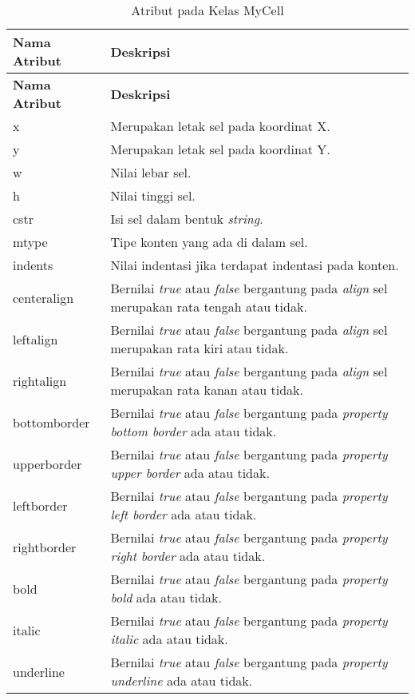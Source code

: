 \begin{small}
\begin{longtable}{ | p{3cm} | p{8cm} | }
    \caption{Atribut pada Kelas MyCell}
    \label{AtributMyCell}\\ \hline
    \centering\bfseries{Nama Atribut} & \centering\bfseries{Deskripsi} \tabularnewline \hline
    \endfirsthead
    \hline
    \centering\bfseries{Nama Atribut} & \centering\bfseries{Deskripsi} \tabularnewline \hline
    \endhead
    x & Merupakan letak sel pada koordinat X.\\ \hline
    y & Merupakan letak sel pada koordinat Y. \\ \hline
    w & Nilai lebar sel.\\ \hline
    h & Nilai tinggi sel.\\ \hline
    cstr & Isi sel dalam bentuk \textit{string}.\\ \hline
    mtype & Tipe konten yang ada di dalam sel.\\ \hline
    indents & Nilai indentasi jika terdapat indentasi pada konten.\\ \hline
    centeralign & Bernilai \textit{true} atau \textit{false} bergantung pada \textit{align} sel merupakan rata tengah atau tidak.\\ \hline
    leftalign & Bernilai \textit{true} atau \textit{false} bergantung pada \textit{align} sel merupakan rata kiri atau tidak.\\ \hline
    rightalign & Bernilai \textit{true} atau \textit{false} bergantung pada \textit{align} sel merupakan rata kanan atau tidak.\\ \hline
    bottomborder & Bernilai \textit{true} atau \textit{false} bergantung pada \textit{property} \textit{bottom border} ada atau tidak.\\ \hline
    upperborder & Bernilai \textit{true} atau \textit{false} bergantung pada \textit{property} \textit{upper border} ada atau tidak.\\ \hline
    leftborder & Bernilai \textit{true} atau \textit{false} bergantung pada \textit{property} \textit{left border} ada atau tidak.\\ \hline
    rightborder & Bernilai \textit{true} atau \textit{false} bergantung pada \textit{property} \textit{right border} ada atau tidak.\\ \hline
    bold & Bernilai \textit{true} atau \textit{false} bergantung pada \textit{property} \textit{bold} ada atau tidak.\\ \hline
    italic & Bernilai \textit{true} atau \textit{false} bergantung pada \textit{property} \textit{italic} ada atau tidak.\\ \hline
    underline & Bernilai \textit{true} atau \textit{false} bergantung pada \textit{property} \textit{underline} ada atau tidak.\\ \hline
\end{longtable}
\end{small}

